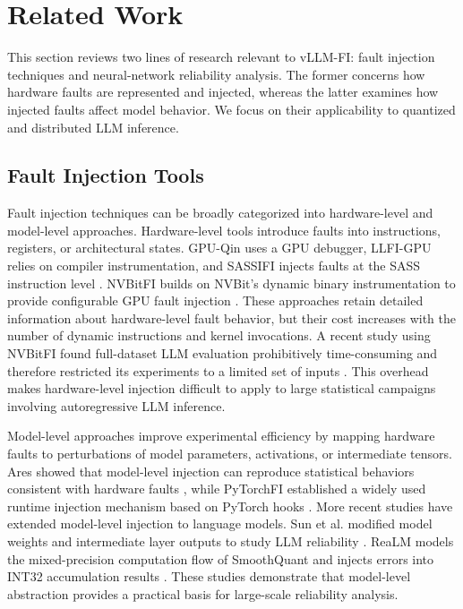 \section{Related Work}

This section reviews two lines of research relevant to vLLM-FI: fault injection techniques and neural-network reliability analysis. The former concerns how hardware faults are represented and injected, whereas the latter examines how injected faults affect model behavior. We focus on their applicability to quantized and distributed LLM inference.

\subsection{Fault Injection Tools}

Fault injection techniques can be broadly categorized into hardware-level and model-level approaches. Hardware-level tools introduce faults into instructions, registers, or architectural states. GPU-Qin uses a GPU debugger, LLFI-GPU relies on compiler instrumentation, and SASSIFI injects faults at the SASS instruction level \cite{fang2014gpu,li2016understanding,hari2017sassifi}. NVBitFI builds on NVBit's dynamic binary instrumentation to provide configurable GPU fault injection \cite{villa2019nvbit,tsai2021nvbitfi}. These approaches retain detailed information about hardware-level fault behavior, but their cost increases with the number of dynamic instructions and kernel invocations. A recent study using NVBitFI found full-dataset LLM evaluation prohibitively time-consuming and therefore restricted its experiments to a limited set of inputs \cite{chai2026analysis}. This overhead makes hardware-level injection difficult to apply to large statistical campaigns involving autoregressive LLM inference.

Model-level approaches improve experimental efficiency by mapping hardware faults to perturbations of model parameters, activations, or intermediate tensors. Ares showed that model-level injection can reproduce statistical behaviors consistent with hardware faults \cite{reagen2018ares}, while PyTorchFI established a widely used runtime injection mechanism based on PyTorch hooks \cite{mahmoud2020pytorchfi}. More recent studies have extended model-level injection to language models. Sun et al. modified model weights and intermediate layer outputs to study LLM reliability \cite{sun2025demystifying,sun2025ft2}. ReaLM models the mixed-precision computation flow of SmoothQuant \cite{xiao2023smoothquant} and injects errors into INT32 accumulation results \cite{xie2025realm}. These studies demonstrate that model-level abstraction provides a practical basis for large-scale reliability analysis.

